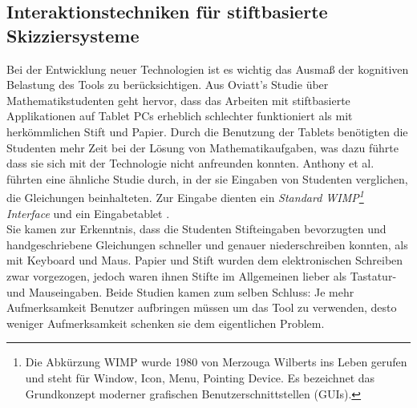 \subsection{Interaktionstechniken für stiftbasierte Skizziersysteme} %
Bei der Entwicklung neuer Technologien ist es wichtig das Ausmaß der kognitiven Belastung des Tools zu berücksichtigen. Aus Oviatt's Studie \citep{Oviatt:2006} über Mathematikstudenten geht hervor, dass das Arbeiten mit stiftbasierte Applikationen auf Tablet PCs erheblich schlechter funktioniert als mit herkömmlichen Stift und Papier. Durch die Benutzung der Tablets benötigten die Studenten mehr Zeit bei der Lösung von Mathematikaufgaben, was dazu führte dass sie sich mit der Technologie nicht anfreunden konnten. Anthony et al. führten eine ähnliche Studie durch, in der sie Eingaben von Studenten verglichen, die Gleichungen beinhalteten. Zur Eingabe dienten ein \emph{Standard \acs{WIMP}\footnote{Die Abkürzung WIMP wurde 1980 von Merzouga Wilberts ins Leben gerufen und steht für Window, Icon, Menu, Pointing Device. Es bezeichnet das Grundkonzept moderner grafischen Benutzerschnittstellen (\acp{GUI}).} Interface} und ein Eingabetablet \citep{Anthony:2005}. \\ Sie kamen zur Erkenntnis, dass die Studenten Stifteingaben bevorzugten und handgeschriebene Gleichungen schneller und genauer niederschreiben konnten, als mit Keyboard und Maus. Papier und Stift wurden dem elektronischen Schreiben zwar vorgezogen, jedoch waren ihnen Stifte im Allgemeinen lieber als Tastatur- und Mauseingaben. Beide Studien kamen zum selben Schluss: Je mehr Aufmerksamkeit Benutzer aufbringen müssen um das Tool zu verwenden, desto weniger Aufmerksamkeit schenken sie dem eigentlichen Problem.

